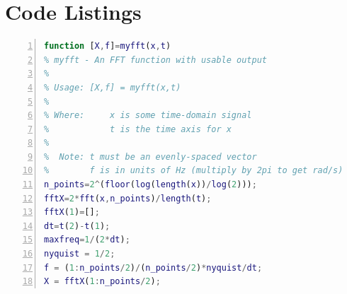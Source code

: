\chapter{Code Listings}

\begin{Spacing}{1}
\begin{lstlisting}[language=matlab,numbers=left,stepnumber=5,numberfirstline=false,firstnumber=1,caption={A Very Old MATLAB Function},label={lst:myfft}]
function [X,f]=myfft(x,t)
% myfft - An FFT function with usable output
%
% Usage: [X,f] = myfft(x,t)
%
% Where:     x is some time-domain signal
%            t is the time axis for x
%
%  Note: t must be an evenly-spaced vector
%        f is in units of Hz (multiply by 2pi to get rad/s)
n_points=2^(floor(log(length(x))/log(2)));
fftX=2*fft(x,n_points)/length(t);
fftX(1)=[];
dt=t(2)-t(1);
maxfreq=1/(2*dt);
nyquist = 1/2;
f = (1:n_points/2)/(n_points/2)*nyquist/dt;
X = fftX(1:n_points/2);
\end{lstlisting}
\end{Spacing}
